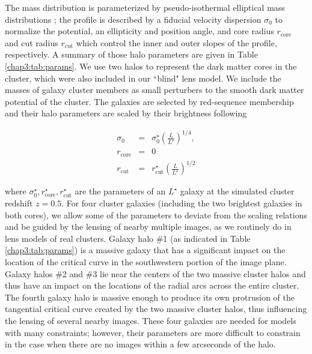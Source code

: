 The mass distribution is parameterized by pseudo-isothermal elliptical mass distributions \citep[PIEMD or dPIE; ][]{Limousin:2005cr}; the profile is described by a fiducial velocity dispersion $\sigma_0$ to normalize the potential, an ellipticity and position angle, and core radius $r_\mathrm{core}$ and cut radius $r_\mathrm{cut}$ which control the inner and outer slopes of the profile, respectively. A summary of those halo parameters are given in Table \ref{chap3:tab:params}. We use two halos to represent the dark matter cores in the cluster, which were also included in our ``blind" lens model. We include the masses of galaxy cluster members as small perturbers to the smooth dark matter potential of the cluster. The galaxies are selected by red-sequence membership and their halo parameters are scaled by their brightness following

\begin{eqnarray}
\sigma_0&=& \sigma_0^\star \left(\frac{L}{L^\star}\right)^{1/4}, \nonumber \\
r_\mathrm{core} &=& 0 \\
r_\mathrm{cut} &=& r_\mathrm{cut}^\star \left(\frac{L}{L^\star}\right)^{1/2} \nonumber
\end{eqnarray}

\noindent where $\sigma_0^\star, r_\mathrm{core}^\star, r_\mathrm{cut}^\star$ are the parameters of an $L^\star$ galaxy at the simulated cluster redshift $z=0.5$. For four cluster galaxies (including the two brightest galaxies in both cores), we allow some of the parameters to deviate from the scaling relations and be guided by the lensing of nearby multiple images, as we routinely do in lens models of real clusters. Galaxy halo \#1 (as indicated in Table \ref{chap3:tab:params}) is a massive galaxy that has a significant impact on the location of the critical curve in the southwestern portion of the image plane. Galaxy halos \#2 and \#3 lie near the centers of the two massive cluster halos and thus have an impact on the locations of the radial arcs across the entire cluster. The fourth galaxy halo is massive enough to produce its own protrusion of the tangential critical curve created by the two massive cluster halos, thus influencing the lensing of several nearby images. These four galaxies are needed for models with many constraints; however, their parameters are more difficult to constrain in the case when there are no images within a few arcseconds of the halo.

